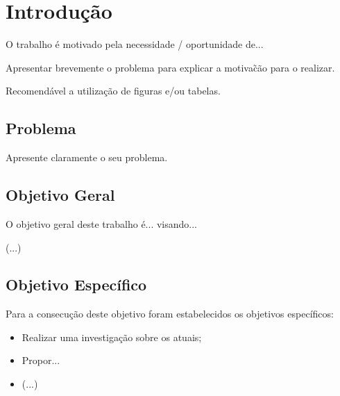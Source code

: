 \chapter[Introdução]{Introdução}
\par O trabalho é motivado pela necessidade / oportunidade de...
\par Apresentar brevemente o problema para explicar a motiva\~c\~ao para o realizar.
\par Recomendável a utilização de figuras e/ou tabelas.

\section{Problema}
\par Apresente claramente o seu problema.

\section{Objetivo Geral}
\par O objetivo geral deste trabalho é... visando...
\par (...)

\section{Objetivo Espec\'ifico}
\par Para a consecução deste objetivo foram estabelecidos os objetivos específicos:
\begin{itemize}
    \item Realizar uma investigação sobre os atuais;
    \item Propor...
    \item (...)
\end{itemize}
